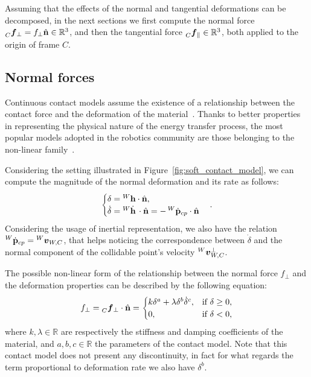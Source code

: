Assuming that the effects of the normal and tangential deformations can be decomposed, in the next sections we first compute the normal force $\forcelin[C]_\perp = f_\perp \hat{\mathbf{n}} \in \mathbb{R}^3$, and then the tangential force $\forcelin[C]_\parallel \in \mathbb{R}^3$, both applied to the origin of frame $C$.

\subsection{Normal forces}
\label{section:normal_forces}

Continuous contact models assume the existence of a relationship between the contact force and the deformation of the material~\parencite{romualdi_modeling_2021}.
Thanks to better properties in representing the physical nature of the energy transfer process, the most popular models adopted in the robotics community are those belonging to the non-linear family~\citep{azad_model_2016}.

Considering the setting illustrated in Figure~\ref{fig:soft_contact_model}, we can compute the magnitude of the normal deformation and its rate as follows:
%
\begin{equation*}
    \begin{cases}
        \delta = {}^W \mathbf{h} \cdot \hat{\mathbf{n}}, \\
        \dot{\delta} = {}^W \dot{\mathbf{h}} \, \cdot \hat{\mathbf{n}} = -\posd[W]_{cp} \cdot \hat{\mathbf{n}}
    \end{cases}
    .
\end{equation*}
%
Considering the usage of inertial representation, we also have the relation $\posd[W]_{cp} = \vellin[W]_{W,C}$, that helps noticing the correspondence between $\dot{\delta}$ and the normal component of the collidable point's velocity $\vellin[W]^\perp_{W,C}$.

The possible non-linear form of the relationship between the normal force $f_\perp$ and the deformation properties can be described by the following equation:
%
\begin{equation*}
    f_\perp = \forcelin[C]_\perp \cdot \hat{\mathbf{n}} =
    \begin{cases}
        k \delta^a + \lambda \delta^b \dot{\delta}^c ,& \text{if $\delta\geq0$,} \\
        0 ,& \text{if $\delta<0$,}
    \end{cases}
\end{equation*}
%
where $k, \lambda \in \mathbb{R}$ are respectively the stiffness and damping coefficients of the material, and $a, b, c \in \mathbb{R}$ the parameters of the contact model.
Note that this contact model does not present any discontinuity, in fact for what regards the term proportional to deformation rate we also have $\delta^b$.


